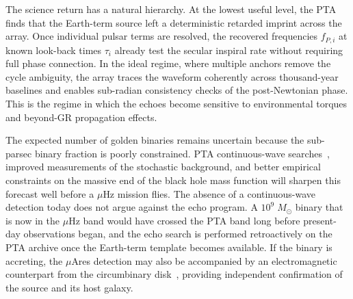 \documentclass[aps,prx,twocolumn,superscriptaddress,nofootinbib,longbibliography]{revtex4-2}
\newcommand{\Msun}{M_\odot}
\begin{document}

The science return has a natural hierarchy. At the lowest useful level, the PTA finds that the Earth-term source left a deterministic retarded imprint across the array. Once individual pulsar terms are resolved, the recovered frequencies $f_{P,i}$ at known look-back times $\tau_i$ already test the secular inspiral rate without requiring full phase connection. In the ideal regime, where multiple anchors remove the cycle ambiguity, the array traces the waveform coherently across thousand-year baselines and enables sub-radian consistency checks of the post-Newtonian phase. This is the regime in which the echoes become sensitive to environmental torques and beyond-GR propagation effects.


The expected number of golden binaries remains uncertain because the sub-parsec binary fraction is poorly constrained. PTA continuous-wave searches~\cite{NG15cw}, improved measurements of the stochastic background, and better empirical constraints on the massive end of the black hole mass function will sharpen this forecast well before a $\mu$Hz mission flies. The absence of a continuous-wave detection today does not argue against the echo program. A $10^9\;\Msun$ binary that is now in the $\mu$Hz band would have crossed the PTA band long before present-day observations began, and the echo search is performed retroactively on the PTA archive once the Earth-term template becomes available. If the binary is accreting, the $\mu$Ares detection may also be accompanied by an electromagnetic counterpart from the circumbinary disk~\cite{Ennoggi2026}, providing independent confirmation of the source and its host galaxy.
\end{document}
